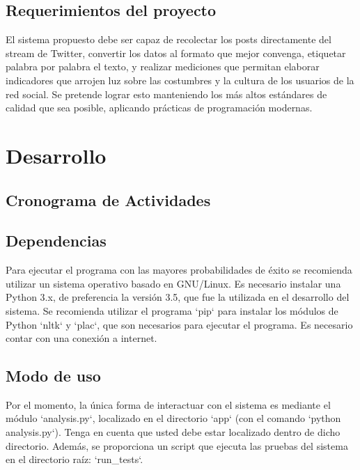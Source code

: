 \documentclass{article}
\begin{document}
\subsection{Requerimientos del proyecto}
El sistema propuesto debe ser capaz de recolectar los posts directamente del
stream de Twitter, convertir los datos al formato que mejor convenga, etiquetar
palabra por palabra el texto, y realizar mediciones que permitan elaborar
indicadores que arrojen luz sobre las costumbres y la cultura de los usuarios
de la red social. Se pretende lograr esto manteniendo los más altos estándares
de calidad que sea posible, aplicando prácticas de programación modernas.

\section{Desarrollo}
\subsection{Cronograma de Actividades}


\subsection{Dependencias}
Para ejecutar el programa con las mayores probabilidades de éxito se recomienda
utilizar un sistema operativo basado en GNU/Linux. Es necesario instalar una
Python 3.x, de preferencia la versión 3.5, que fue la utilizada en el
desarrollo del sistema. Se recomienda utilizar el programa `pip` para instalar
los módulos de Python `nltk` y `plac`, que son necesarios para ejecutar el
programa. Es necesario contar con una conexión a internet.

\subsection{Modo de uso}
Por el momento, la única forma de interactuar con el sistema es mediante el
módulo `analysis.py`, localizado en el directorio `app` (con el comando
`python analysis.py`). Tenga en cuenta que usted debe estar localizado dentro
de dicho directorio. Además, se proporciona un script que ejecuta las pruebas
del sistema en el directorio raíz: `run_tests`.















\end{document}
